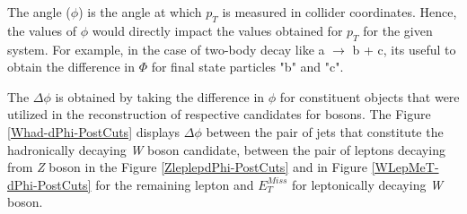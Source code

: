 The angle ($\phi$) is the angle at which $p_{T}$ is measured in collider coordinates. Hence, the values of $\phi$ would directly impact the values obtained for $p_{T}$ for the given system. For example, in the case of two-body decay like a $\rightarrow$ b + c, its useful to obtain the difference in $\Phi$ for final state particles "b" and "c".

The $\Delta\phi$ is obtained by taking the difference in $\phi$ for constituent objects that were utilized in the reconstruction of respective candidates for bosons. The Figure \ref{Whad-dPhi-PostCuts} displays $\Delta\phi$ between the pair of jets that constitute the hadronically decaying \textit{W} boson candidate, between the pair of leptons decaying from \textit{Z} boson in the  Figure \ref{ZleplepdPhi-PostCuts} and in Figure \ref{WLepMeT-dPhi-PostCuts} for the remaining lepton and $E^{Miss}_{T}$ for leptonically decaying \textit{W} boson.

